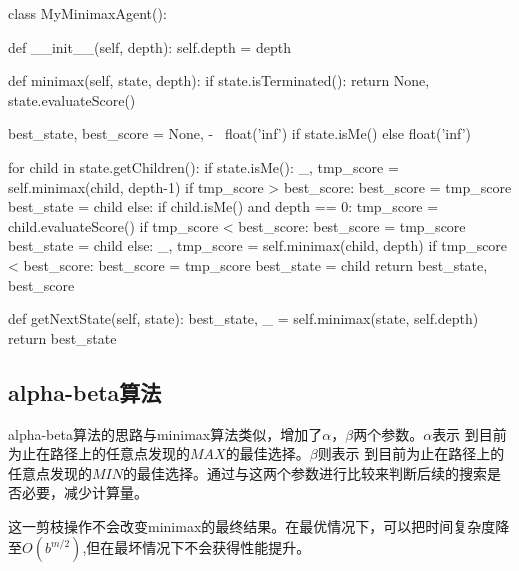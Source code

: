 \documentclass{ctexart}
\begin{document}
\begin{python}
class MyMinimaxAgent():

    def __init__(self, depth):
        self.depth = depth

    def minimax(self, state, depth):
        if state.isTerminated():
            return None, state.evaluateScore()

        best_state, best_score = None, - \
            float('inf') if state.isMe() else float('inf')

        for child in state.getChildren():
            if state.isMe():
                _, tmp_score = self.minimax(child, depth-1)
                if tmp_score > best_score:
                    best_score = tmp_score
                    best_state = child
            else:
                if child.isMe() and depth == 0:
                    tmp_score = child.evaluateScore()
                    if tmp_score < best_score:
                        best_score = tmp_score
                        best_state = child
                else:
                    _, tmp_score = self.minimax(child, depth)
                    if tmp_score < best_score:
                        best_score = tmp_score
                        best_state = child
        return best_state, best_score

    def getNextState(self, state):
        best_state, _ = self.minimax(state, self.depth)
        return best_state
	\end{python}
\subsection{\hei alpha-beta算法}
alpha-beta算法的思路与minimax算法类似，增加了$\alpha$，$\beta$两个参数。$\alpha$表示
到目前为止在路径上的任意点发现的$MAX$的最佳选择。$\beta$则表示
到目前为止在路径上的任意点发现的$MIN$的最佳选择。通过与这两个参数进行比较来判断后续的搜索是否必要，减少计算量。
\par 这一剪枝操作不会改变minimax的最终结果。在最优情况下，可以把时间复杂度降至$O\left(b^{m/2}\right)$,但在最坏情况下不会获得性能提升。
\end{document}
